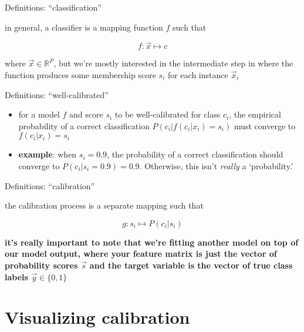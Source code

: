\documentclass[ignorenonframetext,]{beamer}
\providecommand{\tightlist}{%
\setlength{\itemsep}{0pt}\setlength{\parskip}{0pt}}
\begin{document}
\begin{frame}{Definitions: ``classification''}

in general, a classifier is a mapping function \(f\) such that

\[f: \vec{x} \mapsto c\]

where \(\vec{x} \in \mathbb{R}^{P}\), but we're mostly interested in the
intermediate step in where the function produces some membership score
\(s_i\) for each instance \(\vec{x}_i\)

\end{frame}

\begin{frame}{Definitions: ``well-calibrated''}

\begin{itemize}
\tightlist
\item
  for a model \(f\) and score \(s_i\) to be well-calibrated for class
  \(c_i\), the empirical probability of a correct classification
  \(P(c_i | f( c_i | x_i)=s_i)\) must converge to \(f(c_i | x_i) = s_i\)
  \vspace{5mm}
\item
  \textbf{example}: when \(s_i = 0.9\), the probability of a correct
  classification should converge to \(P(c_i | s_i = 0.9) = 0.9\).
  Otherwise, this isn't \textit{really} a `probability.'
\end{itemize}

\end{frame}

\begin{frame}{Definitions: ``calibration''}

the calibration process is a separate mapping such that

\[g: s_i \mapsto P(c_i | s_i)\]

\textbf{it's really important to note that we're fitting another model
on top of our model output, where your feature matrix is just the vector
of probability scores \(\vec{s}\) and the target variable is the vector
of true class labels \(\vec{y} \in \{0,1\}\)}

\end{frame}

\section{Visualizing calibration}\label{visualizing-calibration}
\end{document}
